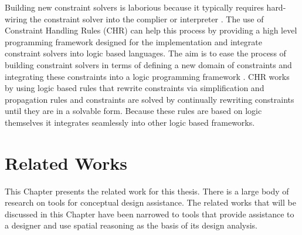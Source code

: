 \documentclass[12pt]{ucthesis}
\begin{document}
Building new constraint solvers is laborious because it typically requires hard-wiring the constraint solver into the complier or interpreter \cite{GavanelliCLP}. The use of Constraint Handling Rules (CHR) can help this process by providing a high level programming framework designed for the implementation and integrate constraint solvers into logic based languages. The aim is to ease the process of building constraint solvers in terms of defining a new domain of constraints and integrating these constraints into a logic programming framework \cite{CHR} \cite{onemore}. CHR works by using logic based rules that rewrite constraints via simplification and propagation rules and constraints are solved by continually rewriting constraints until they are in a solvable form. Because these rules are based on logic themselves it integrates seamlessly into other logic based frameworks. 






\chapter{Related Works} \label{relatedwork}
This Chapter presents the related work for this thesis. There is a large body of research on tools for conceptual design assistance. The related works that will be discussed in this Chapter have been narrowed to tools that provide assistance to a designer and use spatial reasoning as the basis of its design analysis.
\end{document}
